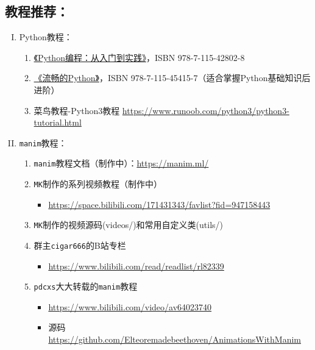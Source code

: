 \documentclass[cn,blue,14pt,normal]{elegantnote}
\begin{document}
\newpage

\subsection*{教程推荐：}

\begin{enumerate}[I.]
	\item Python教程：
	
	\begin{enumerate}[1.]
		\item \href{https://www.ituring.com.cn/book/1861}{《Python编程：从入门到实践》}，ISBN 978-7-115-42802-8
		
		\item \href{https://www.ituring.com.cn/book/1564}{《流畅的Python》}，ISBN 978-7-115-45415-7（适合掌握Python基础知识后进阶）
		
		\item 菜鸟教程-Python3教程 \url{https://www.runoob.com/python3/python3-tutorial.html}
	\end{enumerate}

	\item \texttt{manim}教程：
	
	\begin{enumerate}[1.]
		\item \texttt{manim}教程文档（制作中）：\url{https://manim.ml/}
		
		\item \texttt{MK}制作的系列视频教程（制作中）
		\begin{itemize}
			\item \url{https://space.bilibili.com/171431343/favlist?fid=947158443}
		\end{itemize}
	
		\item \texttt{MK}制作的视频源码(videos/)和常用自定义类(utils/)
	
		\item 群主\texttt{cigar666}的B站专栏
		\begin{itemize}
			\item \url{https://www.bilibili.com/read/readlist/rl82339}
		\end{itemize}
	
		\item \texttt{pdcxs}大大转载的\texttt{manim}教程
		\begin{itemize}
			\item \url{https://www.bilibili.com/video/av64023740}
			\item 源码 \url{https://github.com/Elteoremadebeethoven/AnimationsWithManim}
		\end{itemize}
	

\end{enumerate}
\end{enumerate}
\end{document}
